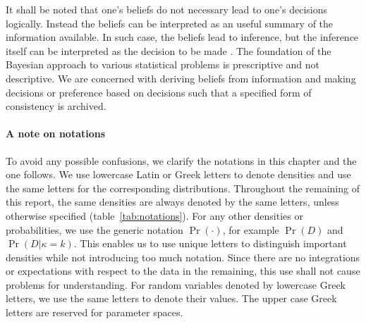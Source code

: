 It shall be noted that one's beliefs do not necessary lead to one's decisions
logically. Instead the beliefs can be interpreted as an useful summary of the
information available. In such case, the beliefs lead to inference, but the
inference itself can be interpreted as the decision to be made
\parencite[][chap.~1]{Lehmann2005}. The foundation of the Bayesian approach to
various statistical problems is prescriptive and not descriptive. We are
concerned with deriving beliefs from information and making decisions or
preference based on decisions such that a specified form of consistency is
archived.

\paragraph{A note on notations} To avoid any possible confusions, we clarify
the notations in this chapter and the one follows. We use lowercase Latin or
Greek letters to denote densities and use the same letters for the
corresponding distributions. Throughout the remaining of this report, the same
densities are always denoted by the same letters, unless otherwise specified
(table~\ref{tab:notations}). For any other densities or probabilities, we use
the generic notation $\Pr(\cdot)$, for example $\Pr(D)$ and $\Pr(D|\kappa=k)$.
This enables us to use unique letters to distinguish important densities while
not introducing too much notation. Since there are no integrations or
expectations with respect to the data in the remaining, this use shall not
cause problems for understanding. For random variables denoted by lowercase
Greek letters, we use the same letters to denote their values. The upper case
Greek letters are reserved for parameter spaces.

